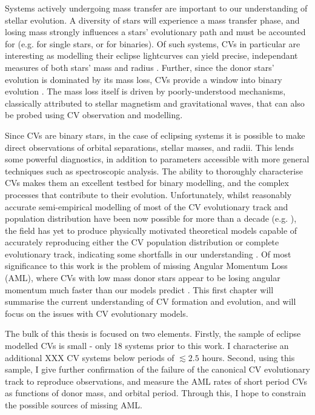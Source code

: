 Systems actively undergoing mass transfer are important to our understanding of stellar evolution. A diversity of stars will experience a mass transfer phase, and losing mass strongly influences a stars' evolutionary path and must be accounted for (e.g. \citealt{renzini1981, smith2014} for single stars, or \citealt{hurley2002} for binaries). Of such systems, CVs in particular are interesting as modelling their eclipse lightcurves can yield precise, independant measures of both stars' mass and radius \citep{wood1986,Littlefair2008,Savoury2011}. Further, since the donor stars' evolution is dominated by its mass loss, CVs provide a window into binary evolution \citep{knigge2006}.
The mass loss itself is driven by poorly-understood mechanisms, classically attributed to stellar magnetism and gravitational waves, that can also be probed using CV observation and modelling.

Since CVs are binary stars, in the case of eclipsing systems it is possible to make direct observations of orbital separations, stellar masses, and radii. This lends some powerful diagnostics, in addition to parameters accessible with more general techniques such as spectroscopic analysis.
The ability to thoroughly characterise CVs makes them an excellent testbed for binary modelling, and the complex processes that contribute to their evolution.
Unfortunately, whilst reasonably accurate semi-empirical modelling of most of the CV evolutionary track and population distribution have been now possible for more than a decade (e.g. \citealt{knigge11,Paxton_2015}), the field has yet to produce physically motivated theoretical models capable of accurately reproducing either the CV population distribution or complete evolutionary track, indicating some shortfalls in our understanding \citep{schreiber2015,Schreiber2016}. 
Of most significance to this work is the problem of missing Angular Momentum Loss (AML), where CVs with low mass donor stars appear to be losing angular momentum much faster than our models predict \citep{Schreiber2016,wild2021}. This first chapter will summarise the current understanding of CV formation and evolution, and will focus on the issues with CV evolutionary models.

The bulk of this thesis is focused on two elements. Firstly, the sample of eclipse modelled CVs is small - only 18 systems prior to this work. 
I characterise an additional XXX CV systems below periods of $\lesssim 2.5$ hours.
Second, using this sample, I give further confirmation of the failure of the canonical CV evolutionary track to reproduce observations, and measure the AML rates of short period CVs as functions of donor mass, and orbital period. Through this, I hope to constrain the possible sources of missing AML.



